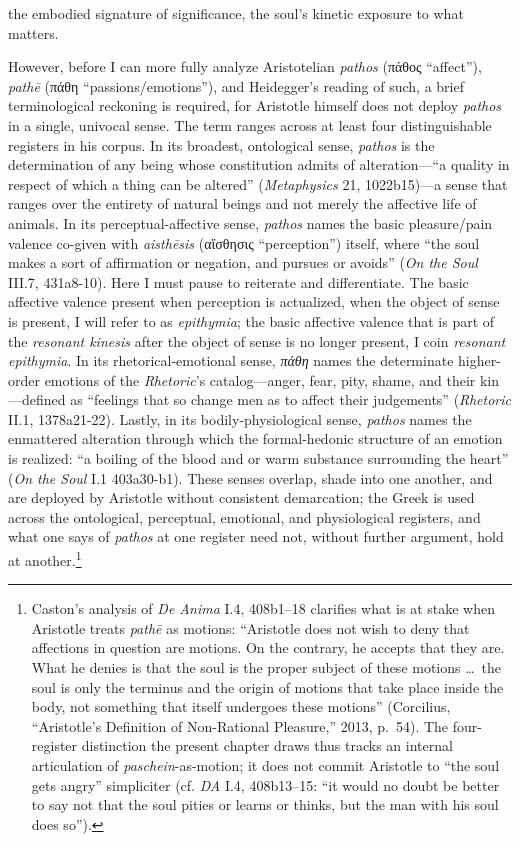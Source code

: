 \documentclass{article}
\newcommand{\gk}[1]{{\greekfont #1}}
\begin{document}
the embodied signature of significance, the soul’s kinetic exposure to what matters. 

However, before I can more fully analyze Aristotelian \textit{pathos} (\gk{πάθος} ``affect''), \textit{pathē} (\gk{πάθη}  ``passions/emotions''), and Heidegger's reading of such, a brief terminological reckoning is required, for Aristotle himself does not deploy \textit{pathos} in a single, univocal sense. The term ranges across at least four distinguishable registers in his corpus. In its broadest, ontological sense, \textit{pathos} is the determination of any being whose constitution admits of alteration---``a quality in respect of which a thing can be altered'' (\textit{Metaphysics} 21, 1022b15)---a sense that ranges over the entirety of natural beings and not merely the affective life of animals. In its perceptual-affective sense, \textit{pathos} names the basic pleasure/pain valence co-given with \textit{aisthēsis} (\gk{αἴσθησις} ``perception'') itself, where ``the soul makes a sort of affirmation or negation, and pursues or avoids'' (\textit{On the Soul} III.7, 431a8-10). Here I must pause to reiterate and differentiate. The basic affective valence present when perception is actualized, when the object of sense is present, I will refer to as \textit{epithymia}; the basic affective valence that is part of the \textit{resonant kinesis} after the object of sense is no longer present, I coin \textit{resonant epithymia}. In its rhetorical-emotional sense, \textit{πάθη} names the determinate higher-order emotions of the \textit{Rhetoric}'s catalog---anger, fear, pity, shame, and their kin---defined as ``feelings that so change men as to affect their judgements'' (\textit{Rhetoric} II.1, 1378a21-22). Lastly, in its bodily-physiological sense, \textit{pathos} names the enmattered alteration through which the formal-hedonic structure of an emotion is realized: ``a boiling of the blood and or warm substance surrounding the heart'' (\textit{On the Soul} I.1 403a30-b1). These senses overlap, shade into one another, and are deployed by Aristotle without consistent demarcation; the Greek is used across the ontological, perceptual, emotional, and physiological registers, and what one says of \textit{pathos} at one register need not, without further argument, hold at another.\footnote{Caston's analysis of \textit{De Anima} I.4, 408b1--18 clarifies what is at stake when Aristotle treats \textit{pathē} as motions: ``Aristotle does not wish to deny that affections in question are motions. On the contrary, he accepts that they are. What he denies is that the soul is the proper subject of these motions \ldots\ the soul is only the terminus and the origin of motions that take place inside the body, not something that itself undergoes these motions'' (Corcilius, ``Aristotle's Definition of Non-Rational Pleasure,'' 2013, p.~54). The four-register distinction the present chapter draws thus tracks an internal articulation of \textit{paschein}-as-motion; it does not commit Aristotle to ``the soul gets angry'' simpliciter (cf. \textit{DA} I.4, 408b13--15: ``it would no doubt be better to say not that the soul pities or learns or thinks, but the man with his soul does so'').}
\end{document}
